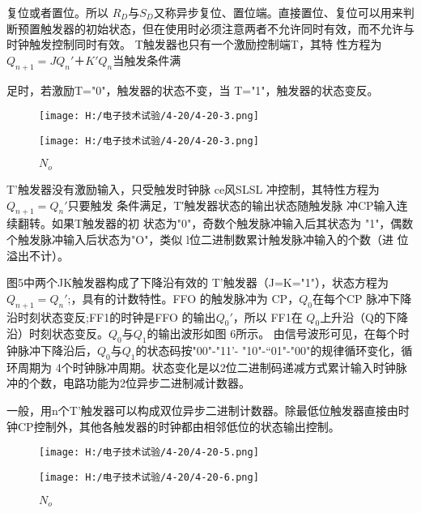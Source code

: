 \documentclass{article}
\begin{document}
      复位或者置位。所以 $R_D$与$S_D$又称异步复位、置位端。直接置位、复位可以用来判断预置触发器的初始状态，但在使用时必须注意两者不允许同时有效，而不允许与时钟触发控制同时有效。
T触发器也只有一个激励控制端T，其特 
性方程为$Q_{n+1}=JQ_n'＋K'Q_n$当触发条件满

足时，若激励T="0"，触发器的状态不变，当
T="1"，触发器的状态变反。
\begin{figure}[h]
    \begin{minipage}[t]{0.5\linewidth} %
      \centering   
      \texttt{[image: H:/电子技术试验/4-20/4-20-3.png]}   
      \caption{$I_{EH}$}   
      \label{fig:side:a}   
    \end{minipage}%
    \begin{minipage}[t]{0.5\linewidth}   
      \centering   
      \texttt{[image: H:/电子技术试验/4-20/4-20-3.png]}   
      \caption{$N_o$}   
      \label{fig:side:b}   
    \end{minipage}   
  \end{figure}
\par
T'触发器没有激励输入，只受触发时钟脉 ce风SLSL
冲控制，其特性方程为$Q_{n+1}=Q_n'$只要触发
条件满足，T′触发器状态的输出状态随触发脉
冲CP输入连续翻转。如果T触发器的初
状态为"0"，奇数个触发脉冲输入后其状态为
"1"，偶数个触发脉冲输入后状态为"O"，类似
l位二进制数累计触发脉冲输入的个数（进
位溢出不计）。\par
图5中两个JK触发器构成了下降沿有效的 T'触发器（J=K="1"），状态方程为$Q_{n+1}=Q_n'$;，具有的计数特性。FFO 的触发脉冲为 CP，$Q_0$在每个CP 脉冲下降沿时刻状态变反;FF1的时钟是FFO 的输出$Q_0'$，所以 FF1在 $Q_0$上升沿（Q的下降沿）时刻状态变反。$Q_0$与$Q_1$的输出波形如图 6所示。
由信号波形可见，在每个时钟脉冲下降沿后，$Q_0$与$Q_1$的状态码按"00"-"11'- "10"-“01"-"00"的规律循环变化，循环周期为 4个时钟脉冲周期。状态变化是以2位二进制码递减方式累计输入时钟脉冲的个数，电路功能为2位异步二进制减计数器。\par 
一般，用n个T'触发器可以构成双位异步二进制计数器。除最低位触发器直接由时钟CP控制外，其他各触发器的时钟都由相邻低位的状态输出控制。

      \begin{figure}[h]
        \begin{minipage}[t]{0.5\linewidth} %
          \centering   
          \texttt{[image: H:/电子技术试验/4-20/4-20-5.png]}   
          \caption{$I_{EH}$}   
          \label{fig:side:a}   
        \end{minipage}%
        \begin{minipage}[t]{0.5\linewidth}   
          \centering   
          \texttt{[image: H:/电子技术试验/4-20/4-20-6.png]}   
          \caption{$N_o$}   
          \label{fig:side:b}   
        \end{minipage}   
      \end{figure}
       
\end{document}
